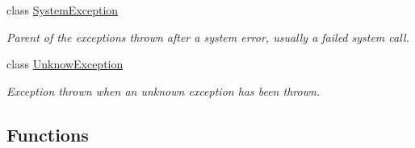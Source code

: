 \begin{DoxyCompactItemize}
class \hyperlink{class_gost_crypt_1_1_system_exception}{System\+Exception}
\begin{DoxyCompactList}\small\item\em Parent of the exceptions thrown after a system error, usually a failed system call. \end{DoxyCompactList}\item 
class \hyperlink{class_gost_crypt_1_1_unknow_exception}{Unknow\+Exception}
\begin{DoxyCompactList}\small\item\em Exception thrown when an unknown exception has been thrown. \end{DoxyCompactList}\end{DoxyCompactItemize}
\subsection*{Functions}
